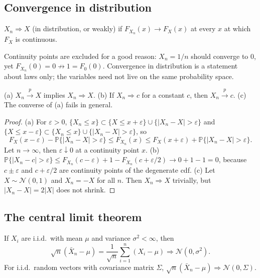 \documentclass[11pt,a4paper]{article}
\renewcommand{\P}{\mathbb{P}}
\newcommand{\N}{\mathcal{N}}
\newcommand{\cp}{\xrightarrow{\;p\;}}
\newcommand{\cd}{\Rightarrow}
\newcommand{\iid}{i.i.d.}
\newcommand{\Xbar}{\bar X_n}
\begin{document}
\subsection{Convergence in distribution}

\begin{definition}
$X_n\cd X$ (in distribution, or weakly) if $F_{X_n}(x)\to F_X(x)$ at every $x$ at which $F_X$ is continuous.
\end{definition}

Continuity points are excluded for a good reason: $X_n=1/n$ should converge to $0$, yet $F_{X_n}(0)=0\not\to1=F_0(0)$. Convergence in distribution is a statement about laws only; the variables need not live on the same probability space.

\begin{theorem}\label{thm:ptod}
\textup{(a)} $X_n\cp X$ implies $X_n\cd X$. \textup{(b)} If $X_n\cd c$ for a constant $c$, then $X_n\cp c$. \textup{(c)} The converse of (a) fails in general.
\end{theorem}

\begin{proof}
(a) For $\varepsilon>0$, $\{X_n\le x\}\subset\{X\le x+\varepsilon\}\cup\{|X_n-X|>\varepsilon\}$ and $\{X\le x-\varepsilon\}\subset\{X_n\le x\}\cup\{|X_n-X|>\varepsilon\}$, so
\[
F_X(x-\varepsilon)-\P\{|X_n-X|>\varepsilon\}\le F_{X_n}(x)\le F_X(x+\varepsilon)+\P\{|X_n-X|>\varepsilon\}.
\]
Let $n\to\infty$, then $\varepsilon\downarrow0$ at a continuity point $x$. (b) $\P\{|X_n-c|>\varepsilon\}\le F_{X_n}(c-\varepsilon)+1-F_{X_n}(c+\varepsilon/2)\to0+1-1=0$, because $c\pm\varepsilon$ and $c+\varepsilon/2$ are continuity points of the degenerate cdf. (c) Let $X\sim\N(0,1)$ and $X_n=-X$ for all $n$. Then $X_n\cd X$ trivially, but $|X_n-X|=2|X|$ does not shrink.
\end{proof}

\subsection{The central limit theorem}

\begin{theorem}\label{thm:clt}
If $X_i$ are \iid\ with mean $\mu$ and variance $\sigma^2<\infty$, then
\[
\sqrt n(\Xbar-\mu)=\frac{1}{\sqrt n}\sum_{i=1}^n(X_i-\mu)\cd\N(0,\sigma^2).
\]
For \iid\ random vectors with covariance matrix $\Sigma$, $\sqrt n(\Xbar-\mu)\cd\N(0,\Sigma)$.
\end{theorem}
\end{document}
